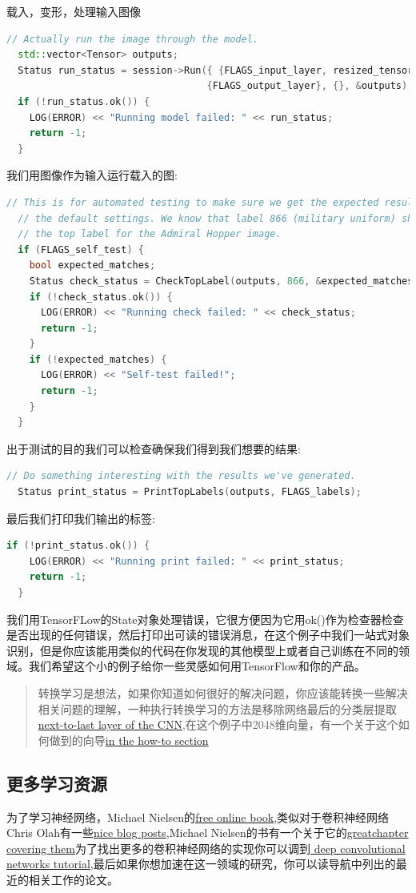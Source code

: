 载入，变形，处理输入图像
\begin{lstlisting}[language=C++]
  // Actually run the image through the model.
  std::vector<Tensor> outputs;
  Status run_status = session->Run({ {FLAGS_input_layer, resized_tensor}},
                                   {FLAGS_output_layer}, {}, &outputs);
  if (!run_status.ok()) {
    LOG(ERROR) << "Running model failed: " << run_status;
    return -1;
  }
\end{lstlisting}
我们用图像作为输入运行载入的图:
\begin{lstlisting}[language=C++]
  // This is for automated testing to make sure we get the expected result with
  // the default settings. We know that label 866 (military uniform) should be
  // the top label for the Admiral Hopper image.
  if (FLAGS_self_test) {
    bool expected_matches;
    Status check_status = CheckTopLabel(outputs, 866, &expected_matches);
    if (!check_status.ok()) {
      LOG(ERROR) << "Running check failed: " << check_status;
      return -1;
    }
    if (!expected_matches) {
      LOG(ERROR) << "Self-test failed!";
      return -1;
    }
  }
\end{lstlisting}
出于测试的目的我们可以检查确保我们得到我们想要的结果:
\begin{lstlisting}[language=C++]
// Do something interesting with the results we've generated.
  Status print_status = PrintTopLabels(outputs, FLAGS_labels);
\end{lstlisting}
最后我们打印我们输出的标签:
\begin{lstlisting}[language=C++]
 if (!print_status.ok()) {
    LOG(ERROR) << "Running print failed: " << print_status;
    return -1;
  }
\end{lstlisting}
我们用TensorFLow的State对象处理错误，它很方便因为它用ok()作为检查器检查是否出现的任何错误，然后打印出可读的错误消息，在这个例子中我们一站式对象识别，但是你应该能用类似的代码在你发现的其他模型上或者自己训练在不同的领域。我们希望这个小的例子给你一些灵感如何用TensorFlow和你的产品。
\begin{quote}
转换学习是想法，如果你知道如何很好的解决问题，你应该能转换一些解决相关问题的理解，一种执行转换学习的方法是移除网络最后的分类层提取\href{http://arxiv.org/abs/1310.1531}{next-to-last layer of the CNN},在这个例子中2048维向量，有一个关于这个如何做到的向导\href{https://www.tensorflow.org/tutorials/image_retraining}{in the how-to section}
\end{quote}
\subsection{更多学习资源}
为了学习神经网络，Michael Nielsen的\href{http://neuralnetworksanddeeplearning.com/chap1.html}{free online book},类似对于卷积神经网络Chris Olah有一些\href{http://colah.github.io/posts/2014-07-Conv-Nets-Modular/}{nice blog posts},Michael Nielsen的书有一个关于它的\href{http://neuralnetworksanddeeplearning.com/chap6.html}{greatchapter covering them}为了找出更多的卷积神经网络的实现你可以调到\href{https://www.tensorflow.org/tutorials/deep_cnn}{ deep convolutional networks tutorial},最后如果你想加速在这一领域的研究，你可以读导航中列出的最近的相关工作的论文。

